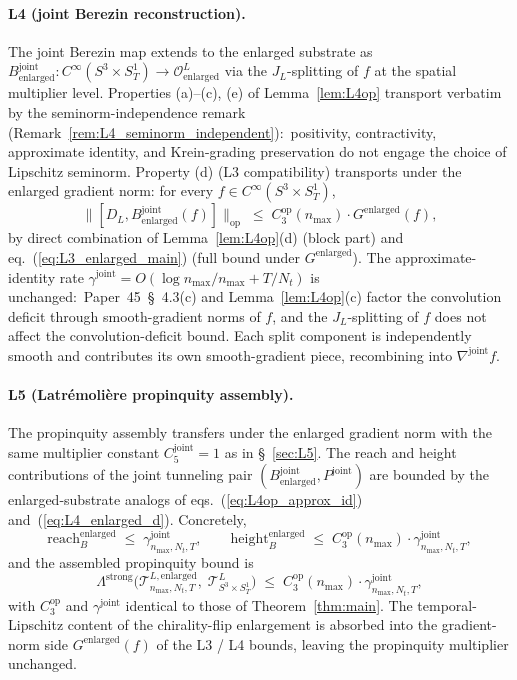 \documentclass[11pt,a4paper]{article}
\theoremstyle{plain}
\theoremstyle{definition}
\newcommand{\nmax}{n_{\max}}
\newcommand{\Nt}{N_{t}}
\newcommand{\Manifold}{S^{3}\times S^{1}_{T}}
\newcommand{\Op}{\mathcal{O}}
\newcommand{\Tcal}{\mathcal{T}}
\newcommand{\opnorm}[1]{\lVert #1 \rVert_{\mathrm{op}}}
\newcommand{\DL}{D_{L}}
\newcommand{\JL}{J_{L}}
\newcommand{\Lprop}{\Lambda^{\mathrm{strong}}}
\newcommand{\Bjoint}{B^{\mathrm{joint}}}
\newcommand{\Pjoint}{P^{\mathrm{joint}}}
\newcommand{\gammajoint}{\gamma^{\mathrm{joint}}}
\newcommand{\Cthreeop}{C_{3}^{\mathrm{op}}}
\newcommand{\Cfivejoint}{C_{5}^{\mathrm{joint}}}
\begin{document}
\paragraph{L4 (joint Berezin reconstruction).}
The joint Berezin map extends to the enlarged substrate as
$\Bjoint_{\mathrm{enlarged}} : C^{\infty}(\Manifold) \to
\Op^{L}_{\mathrm{enlarged}}$ via the $\JL$-splitting of $f$ at the
spatial multiplier level. Properties (a)--(c), (e) of
Lemma~\ref{lem:L4op} transport verbatim by the seminorm-independence
remark (Remark~\ref{rem:L4_seminorm_independent}):\ positivity,
contractivity, approximate identity, and Krein-grading preservation
do not engage the choice of Lipschitz seminorm. Property (d) (L3
compatibility) transports under the enlarged gradient norm: for
every $f \in C^{\infty}(\Manifold)$,
\begin{equation}\label{eq:L4_enlarged_d}
   \opnorm{[\DL, \Bjoint_{\mathrm{enlarged}}(f)]}
   \;\le\; \Cthreeop(\nmax) \cdot G^{\mathrm{enlarged}}(f),
\end{equation}
by direct combination of Lemma~\ref{lem:L4op}(d) (block part) and
eq.~(\ref{eq:L3_enlarged_main}) (full bound under $G^{\mathrm{enlarged}}$).
The approximate-identity rate $\gammajoint = O(\log\nmax/\nmax + T/\Nt)$
is unchanged:\ Paper~45~\S~4.3(c) and Lemma~\ref{lem:L4op}(c) factor
the convolution deficit through smooth-gradient norms of $f$, and the
$\JL$-splitting of $f$ does not affect the convolution-deficit
bound. Each split component is independently smooth and contributes
its own smooth-gradient piece, recombining into $\nabla^{\mathrm{joint}} f$.

\paragraph{L5 (Latr\'emoli\`ere propinquity assembly).}
The propinquity assembly transfers under the enlarged gradient norm
with the same multiplier constant $\Cfivejoint = 1$ as in
\S~\ref{sec:L5}. The reach and height contributions of the joint
tunneling pair $(\Bjoint_{\mathrm{enlarged}}, \Pjoint)$ are bounded
by the enlarged-substrate analogs of eqs.~(\ref{eq:L4op_approx_id})
and~(\ref{eq:L4_enlarged_d}). Concretely,
\begin{equation*}
   \mathrm{reach}_{B}^{\mathrm{enlarged}}
   \;\le\; \gammajoint_{\nmax, \Nt, T},
   \qquad
   \mathrm{height}_{B}^{\mathrm{enlarged}}
   \;\le\; \Cthreeop(\nmax) \cdot \gammajoint_{\nmax, \Nt, T},
\end{equation*}
and the assembled propinquity bound is
\begin{equation}\label{eq:L5_enlarged}
   \Lprop\!\bigl(\Tcal^{L, \mathrm{enlarged}}_{\nmax, \Nt, T},\;
                 \Tcal^{L}_{\Manifold}\bigr)
   \;\le\; \Cthreeop(\nmax) \cdot \gammajoint_{\nmax, \Nt, T},
\end{equation}
with $\Cthreeop$ and $\gammajoint$ identical to those of
Theorem~\ref{thm:main}. The temporal-Lipschitz content of the
chirality-flip enlargement is absorbed into the gradient-norm side
$G^{\mathrm{enlarged}}(f)$ of the L3 / L4 bounds, leaving the
propinquity multiplier unchanged.
\end{document}
